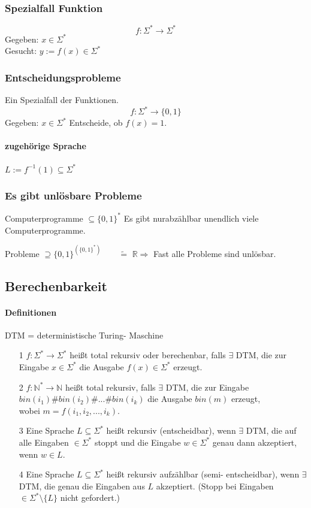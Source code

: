 \documentclass[fleqn]{scrartcl}
\begin{document}
\subsubsection{Spezialfall Funktion} 
\[f : \Sigma^* \rightarrow \Sigma^*\]
Gegeben: $x \in \Sigma^*$\\
Gesucht: $y := f(x) \in \Sigma^*$

\subsubsection{Entscheidungsprobleme}
Ein Spezialfall der Funktionen.
\[f : \Sigma^* \rightarrow \{0, 1\}\]
Gegeben: $x \in \Sigma^*$
Entscheide, ob $f(x) = 1$.

\paragraph{zugehörige Sprache} $L := f^{-1} (1) \subseteq \Sigma^*$

\subsubsection{Es gibt unlösbare Probleme}
Computerprogramme $\subseteq \{0, 1\}^*$
Es gibt \glqq nur\grqq abzählbar unendlich viele Computerprogramme.

Probleme $\supseteq \{0, 1\}^{(\{0, 1\}^*)} \qquad \widetilde{=} \,\, \mathbb{R} \Rightarrow$ Fast alle Probleme sind unlösbar.

\newpage
\subsection{Berechenbarkeit}
\paragraph{Definitionen}
DTM = deterministische Turing- Maschine
\begin{itemize}
\item[1]$f: \Sigma^* \rightarrow \Sigma^*$ heißt total rekursiv oder berechenbar, falls $\exists$ DTM, die zur Eingabe $x \in \Sigma^*$ die Ausgabe $f(x) \in \Sigma^*$ erzeugt.
\item[2]$f : \mathbb{N}^* \rightarrow \mathbb{N}$ heißt total rekursiv, falls $\exists$ DTM, die zur Eingabe \\
$bin(i_1) \# bin(i_2) \# ... \# bin(i_k)$ die Ausgabe $bin(m)$ erzeugt,\\
wobei $m = f(i_1, i_2, ..., i_k)$.
\item[3] Eine Sprache $L \subseteq \Sigma^*$ heißt rekursiv (entscheidbar), wenn $\exists$ DTM, die auf alle Eingaben $\in \Sigma^*$ stoppt und die Eingabe $w \in \Sigma^*$ genau dann akzeptiert, wenn $w \in L$.
\item[4] Eine Sprache $L \subseteq \Sigma^*$ heißt rekursiv aufzählbar (semi- entscheidbar), wenn $\exists$ DTM, die genau die Eingaben aus $L$ akzeptiert. (Stopp bei Eingaben $\in \Sigma^* \setminus \{L\}$ nicht gefordert.)

\end{itemize}
\end{document}
